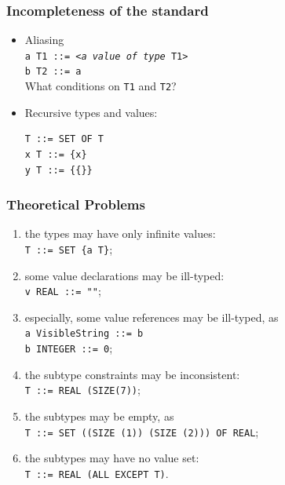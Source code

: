 \documentclass[compress,dvips,xcolor={dvipsnames},t]{beamer}
\begin{document}
\begin{frame}[containsverbatim]
\frametitle{Incompleteness of the standard}

\begin{itemize}

  \item Aliasing\\
        \texttt{a T1 ::= <\emph{a value of type} T1>}\\
        \texttt{b T2 ::= a} \\
        What conditions on \texttt{T1} and \texttt{T2}?

  \item Recursive types and values:
\begin{verbatim}
T ::= SET OF T
x T ::= {x}
y T ::= {{}}
\end{verbatim}

\end{itemize}

\end{frame}

\begin{frame}
\frametitle{Theoretical Problems}

\begin{enumerate}

  \item \label{finiteness} the types may have only infinite
        values:\\
        \texttt{T ::= SET \{a T\}};

  \item \label{type_conformance} some value declarations may be
        ill-typed:\\
        \texttt{v REAL ::= ""};

  \item \label{type_compatibility} especially, some value references
        may be ill-typed, as\\
        \texttt{a VisibleString ::= b}\\
        \texttt{b INTEGER ::= 0};

  \item \label{constraint_consistence} the subtype constraints may
        be inconsistent:\\
        \texttt{T ::= REAL (SIZE(7))};

  \item \label{subtype_non_emptyness} the subtypes may be empty, as\\
        \texttt{T ::= SET ((SIZE (1))  (SIZE (2))) OF REAL};

  \item \label{solvability} the subtypes may have no value set:\\
        \texttt{T ::= REAL (ALL EXCEPT T)}.

\end{enumerate}

\end{frame}
\end{document}
